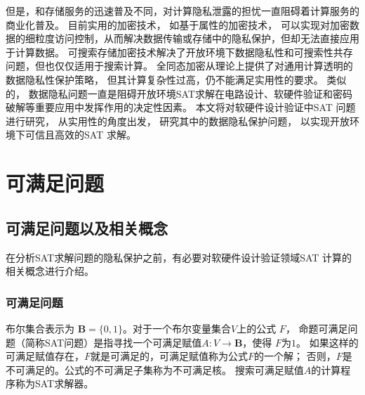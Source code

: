 但是，和存储服务的迅速普及不同，对计算隐私泄露的担忧一直阻碍着计算服务的商业化普及。
目前实用的加密技术，
如基于属性的加密技术，
可以实现对加密数据的细粒度访问控制，从而解决数据传输或存储中的隐私保护，但却无法直接应用于计算数据。
可搜索存储加密技术解决了开放环境下数据隐私性和可搜索性共存问题，但也仅仅适用于搜索计算。
全同态加密从理论上提供了对通用计算透明的数据隐私性保护策略，
但其计算复杂性过高，仍不能满足实用性的要求。
类似的，
数据隐私问题一直是阻碍开放环境SAT求解在电路设计、软硬件验证和密码破解等重要应用中发挥作用的决定性因素。
本文将对软硬件设计验证中SAT 问题进行研究，
从实用性的角度出发，
研究其中的数据隐私保护问题，
以实现开放环境下可信且高效的SAT 求解。

\section {可满足问题}
\subsection{可满足问题以及相关概念}
在分析SAT求解问题的隐私保护之前，有必要对软硬件设计验证领域SAT 计算的相关概念进行介绍。
\subsubsection{可满足问题}
布尔集合表示为 $\mathbf{B}=\{0,1\}$。对于一个布尔变量集合$V$上的公式 $F$，
命题可满足问题（简称SAT问题）是指寻找一个可满足赋值$A : V\to \mathbf{B}$，使得 $F$为$1$。
如果这样的可满足赋值存在，$F$就是可满足的，可满足赋值称为公式$F$的一个解；
否则，$F$是不可满足的。公式的不可满足子集称为不可满足核。
搜索可满足赋值$A$的计算程序称为SAT求解器。

